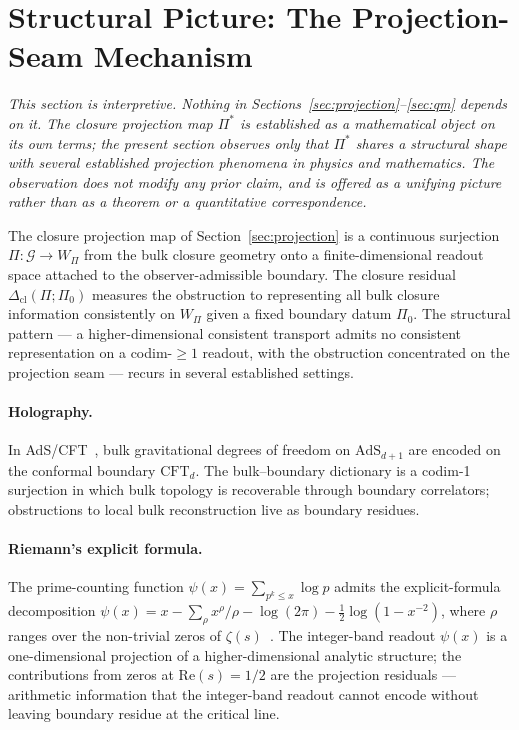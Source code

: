 \documentclass[12pt]{article}
\newcommand{\Gcal}{\mathcal{G}}
\newcommand{\Dcl}{\Delta_{\mathrm{cl}}}
\begin{document}
\section{Structural Picture: The Projection-Seam Mechanism}\label{sec:projection_seam}

\noindent\textit{This section is interpretive. Nothing in Sections~\ref{sec:projection}--\ref{sec:qm} depends on it. The closure projection map $\Pi^*$ is established as a mathematical object on its own terms; the present section observes only that $\Pi^*$ shares a structural shape with several established projection phenomena in physics and mathematics. The observation does not modify any prior claim, and is offered as a unifying picture rather than as a theorem or a quantitative correspondence.}

\medskip

The closure projection map of Section~\ref{sec:projection} is a continuous surjection $\Pi : \Gcal \to W_\Pi$ from the bulk closure geometry onto a finite-dimensional readout space attached to the observer-admissible boundary. The closure residual $\Dcl(\Pi; \Pi_0)$ measures the obstruction to representing all bulk closure information consistently on $W_\Pi$ given a fixed boundary datum $\Pi_0$. The structural pattern --- a higher-dimensional consistent transport admits no consistent representation on a codim-$\geq 1$ readout, with the obstruction concentrated on the projection seam --- recurs in several established settings.

\paragraph{Holography.} In AdS/CFT~\citep{Maldacena1998}, bulk gravitational degrees of freedom on $\mathrm{AdS}_{d+1}$ are encoded on the conformal boundary $\mathrm{CFT}_d$. The bulk--boundary dictionary is a codim-1 surjection in which bulk topology is recoverable through boundary correlators; obstructions to local bulk reconstruction live as boundary residues.

\paragraph{Riemann's explicit formula.} The prime-counting function $\psi(x) = \sum_{p^k \leq x} \log p$ admits the explicit-formula decomposition $\psi(x) = x - \sum_\rho x^\rho/\rho - \log(2\pi) - \tfrac{1}{2}\log(1 - x^{-2})$, where $\rho$ ranges over the non-trivial zeros of $\zeta(s)$~\citep{Edwards1974}. The integer-band readout $\psi(x)$ is a one-dimensional projection of a higher-dimensional analytic structure; the contributions from zeros at $\mathrm{Re}(s) = 1/2$ are the projection residuals --- arithmetic information that the integer-band readout cannot encode without leaving boundary residue at the critical line.
\end{document}
